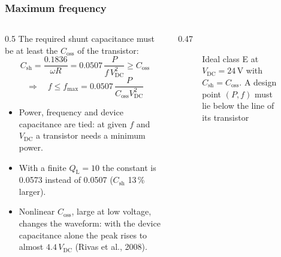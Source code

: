 \begin{frame}
	\frametitle{Maximum frequency}
	\begin{columns}[T]
		\begin{column}{0.5\textwidth}
			\footnotesize
			The required shunt capacitance must be at least the $C_\mathrm{oss}$ of the transistor:
			\begin{equation*}
				C_\mathrm{sh}=\frac{0.1836}{\omega R}=0.0507\,\frac{P}{f\,V_\mathrm{DC}^2}\geq C_\mathrm{oss}
			\end{equation*}
			\begin{equation*}
				\Rightarrow\quad f\leq f_\mathrm{max}=0.0507\,\frac{P}{C_\mathrm{oss}V_\mathrm{DC}^2}
			\end{equation*}
			\begin{itemize}
				\item Power, frequency and device capacitance are tied: at given $f$ and $V_\mathrm{DC}$ a transistor needs a minimum power.
				\item With a finite $Q_\mathrm{L}=10$ the constant is 0.0573 instead of 0.0507 ($C_\mathrm{sh}$ 13\,\% larger).
				\item Nonlinear $C_\mathrm{oss}$, large at low voltage, changes the waveform: with the device capacitance alone the peak rises to almost $4.4\,V_\mathrm{DC}$ (Rivas et al., 2008).
			\end{itemize}
		\end{column}
		\begin{column}{0.47\textwidth}
			\begin{figure}
				\centering
				\caption{Ideal class E at $V_\mathrm{DC}=24$\,V with $C_\mathrm{sh}=C_\mathrm{oss}$. A design point $(P,f)$ must lie below the line of its transistor}
			\end{figure}
		\end{column}
	\end{columns}
\end{frame}

